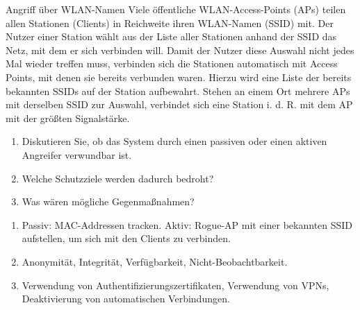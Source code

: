 \documentclass{article}
\begin{document}
\begin{exercise}{Angriff über WLAN-Namen}
  Viele öffentliche WLAN-Access-Points (APs) teilen allen Stationen (Clients) in Reichweite ihren WLAN-Namen (SSID) mit. Der Nutzer einer Station wählt aus der Liste aller Stationen anhand der SSID das Netz, mit dem er sich verbinden will. Damit der Nutzer diese Auswahl nicht jedes Mal wieder treffen muss, verbinden sich die Stationen automatisch mit Access Points, mit denen sie bereits verbunden waren. Hierzu wird eine Liste der bereits bekannten SSIDs auf der Station aufbewahrt. Stehen an einem Ort mehrere APs mit derselben SSID zur Auswahl, verbindet sich eine Station i. d. R. mit dem AP mit der größten Signalstärke.
  \begin{enumerate}
    \item Diskutieren Sie, ob das System durch einen passiven oder einen aktiven Angreifer verwundbar ist.
    \item Welche Schutzziele werden dadurch bedroht?
    \item Was wären mögliche Gegenmaßnahmen?
  \end{enumerate}

  \begin{solution}
    \begin{enumerate}
      \item Passiv: MAC-Addressen tracken. Aktiv: Rogue-AP mit einer bekannten SSID aufstellen, um sich mit den Clients zu verbinden.
      \item Anonymität, Integrität, Verfügbarkeit, Nicht-Beobachtbarkeit.
      \item Verwendung von Authentifizierungszertifikaten, Verwendung von VPNs, Deaktivierung von automatischen Verbindungen.
    \end{enumerate}
  \end{solution}
\end{exercise}
\end{document}
